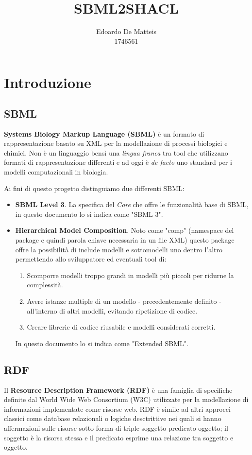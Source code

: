 \documentclass{article}
\title{SBML2SHACL}
\author{Edoardo De Matteis \\ 1746561}
\begin{document}
\maketitle
\tableofcontents

\clearpage

\section{Introduzione}

\subsection{SBML}
\textbf{Systems Biology Markup Language (SBML)} è un formato di rappresentazione basato su XML per la modellazione di processi biologici e chimici. Non è un linguaggio bensì una \textit{lingua franca} tra tool che utilizzano formati di rappresentazione differenti e ad oggi è \textit{de facto} uno standard per i modelli computazionali in biologia. 

Ai fini di questo progetto distinguiamo due differenti SBML:
\begin{itemize}
    \item \textbf{SBML Level 3}. La specifica del \textit{Core} che offre le funzionalità base di SBML, in questo documento lo si indica come "SBML 3".
    \item \textbf{Hierarchical Model Composition}. Noto come "comp" (namespace del package e quindi parola chiave necessaria in un file XML) questo package offre la possibilità di include modelli e sottomodelli uno dentro l'altro permettendo allo sviluppatore ed eventuali tool di:
    \begin{enumerate}
        \item Scomporre modelli troppo grandi in modelli più piccoli per ridurne la complessità.
        \item Avere istanze multiple di un modello - precedentemente definito - all'interno di altri modelli, evitando ripetizione di codice. 
        \item Creare librerie di codice riusabile e modelli considerati corretti. 
    \end{enumerate}
    In questo documento lo si indica come "Extended SBML". 
\end{itemize}


\subsection{RDF}
Il \textbf{Resource Description Framework (RDF)} è una famiglia di specifiche definite dal World Wide Web Consortium (W3C) utilizzate per la modellazione di informazioni implementate come risorse web. RDF è simile ad altri approcci classici come database relazionali o logiche desctrittive nei quali si hanno affermazioni sulle risorse sotto forma di triple soggetto-predicato-oggetto; il soggetto è la risorsa stessa e il predicato esprime una relazione tra soggetto e oggetto.
\end{document}
